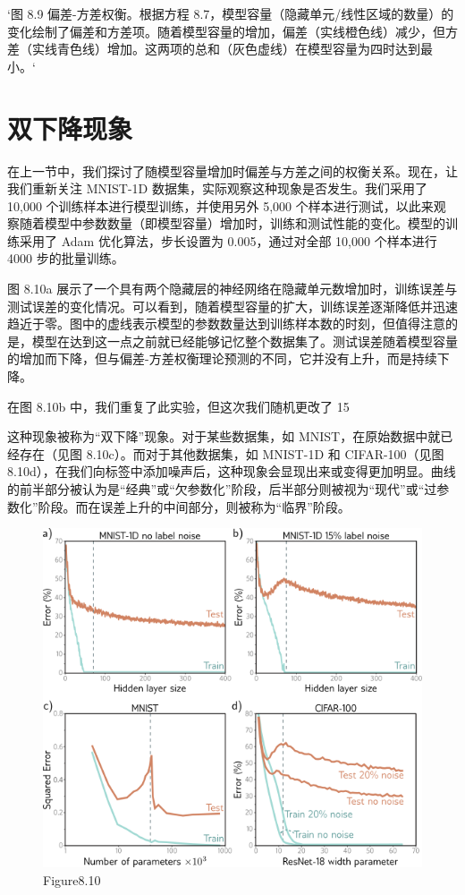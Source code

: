 `图 8.9 偏差-方差权衡。根据方程 8.7，模型容量（隐藏单元/线性区域的数量）的变化绘制了偏差和方差项。随着模型容量的增加，偏差（实线橙色线）减少，但方差（实线青色线）增加。这两项的总和（灰色虚线）在模型容量为四时达到最小。`
\section{双下降现象}
在上一节中，我们探讨了随模型容量增加时偏差与方差之间的权衡关系。现在，让我们重新关注 MNIST-1D 数据集，实际观察这种现象是否发生。我们采用了 10,000 个训练样本进行模型训练，并使用另外 5,000 个样本进行测试，以此来观察随着模型中参数数量（即模型容量）增加时，训练和测试性能的变化。模型的训练采用了 Adam 优化算法，步长设置为 0.005，通过对全部 10,000 个样本进行 4000 步的批量训练。

图 8.10a 展示了一个具有两个隐藏层的神经网络在隐藏单元数增加时，训练误差与测试误差的变化情况。可以看到，随着模型容量的扩大，训练误差逐渐降低并迅速趋近于零。图中的虚线表示模型的参数数量达到训练样本数的时刻，但值得注意的是，模型在达到这一点之前就已经能够记忆整个数据集了。测试误差随着模型容量的增加而下降，但与偏差-方差权衡理论预测的不同，它并没有上升，而是持续下降。

在图 8.10b 中，我们重复了此实验，但这次我们随机更改了 15%

这种现象被称为“双下降”现象。对于某些数据集，如 MNIST，在原始数据中就已经存在（见图 8.10c）。而对于其他数据集，如 MNIST-1D 和 CIFAR-100（见图 8.10d），在我们向标签中添加噪声后，这种现象会显现出来或变得更加明显。曲线的前半部分被认为是“经典”或“欠参数化”阶段，后半部分则被视为“现代”或“过参数化”阶段。而在误差上升的中间部分，则被称为“临界”阶段。

\begin{figure}[h!]
\centering
\includegraphics[width=0.7\linewidth]{png/chapter8/PerfDoubleDescent.png}
\caption{Figure8.10}
\end{figure}

